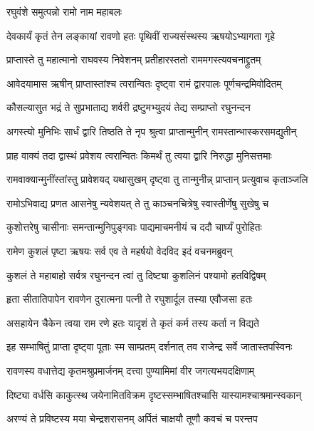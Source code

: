 
\onelineshloka
{रघुवंशे समुत्पन्नो रामो नाम महाबलः}%

\twolineshloka
{देवकार्यं कृतं तेन लङ्कायां रावणो हतः}
{पृथिवीं राज्यसंस्थस्य ऋषयोऽभ्यागता गृहे}%

\twolineshloka
{प्राप्तास्ते तु महात्मानो राघवस्य निवेशनम्}
{प्रतीहारस्ततो राममगस्त्यवचनाद्द्रुतम्}%

\twolineshloka
{आवेदयामास ऋषीन् प्राप्तास्तांश्च त्वरान्वितः}
{दृष्ट्वा रामं द्वारपालः पूर्णचन्द्रमिवोदितम्}%

\twolineshloka
{कौसल्यासुत भद्रं ते सुप्रभाताद्य शर्वरी}
{द्रष्टुमभ्युदयं तेद्य सम्प्राप्तो रघुनन्दन}%

\twolineshloka
{अगस्त्यो मुनिभिः सार्धं द्वारि तिष्ठति ते नृप}
{श्रुत्वा प्राप्तान्मुनीन् रामस्तान्भास्करसमद्युतीन्}%

\twolineshloka
{प्राह वाक्यं तदा द्वास्थं प्रवेशय त्वरान्वितः}
{किमर्थं तु त्वया द्वारि निरुद्धा मुनिसत्तमाः}%

\twolineshloka
{रामवाक्यान्मुनींस्तांस्तु प्रावेशयद् यथासुखम्}
{दृष्ट्वा तु तान्मुनीन्न् प्राप्तान् प्रत्युवाच कृताञ्जलि}%

\twolineshloka
{रामोऽभिवाद्य प्रणत आसनेषु न्यवेशयत्}
{ते तु काञ्चनचित्रेषु स्वास्तीर्णेषु सुखेषु च}%

\twolineshloka
{कुशोत्तरेषु चासीनाः समन्तान्मुनिपुङ्गवाः}
{पाद्यमाचमनीयं च ददौ चार्घ्यं पुरोहितः}%

\twolineshloka
{रामेण कुशलं पृष्टा ऋषयः सर्व एव ते}
{महर्षयो वेदविद इदं वचनमब्रुवन्}%

\twolineshloka
{कुशलं ते महाबाहो सर्वत्र रघुनन्दन}
{त्वां तु दिष्ट्या कुशलिनं पश्यामो हतविद्विषम्}%

\twolineshloka
{हृता सीतातिपापेन रावणेन दुरात्मना}
{पत्नी ते रघुशार्दूल तस्या एवौजसा हतः}%

\twolineshloka
{असहायेन चैकेन त्वया राम रणे हतः}
{यादृशं ते कृतं कर्म तस्य कर्ता न विद्यते}%

\twolineshloka
{इह सम्भाषितुं प्राप्ता दृष्ट्वा पूताः स्म साम्प्रतम्}
{दर्शनात् तव राजेन्द्र सर्वे जातास्तपस्विनः}%

\twolineshloka
{रावणस्य वधात्तेद्य कृतमश्रुप्रमार्जनम्}
{दत्त्वा पुण्यामिमां वीर जगत्यभयदक्षिणाम्}%

\twolineshloka
{दिष्ट्या वर्धसि काकुत्स्थ जयेनामितविक्रम}
{दृष्टस्सम्भाषितश्चासि यास्यामश्चाश्रमान्स्वकान्}%

\twolineshloka
{अरण्यं ते प्रविष्टस्य मया चेन्द्रशरासनम्}
{अर्पितं चाक्षयौ तूणौ कवचं च परन्तप}%

